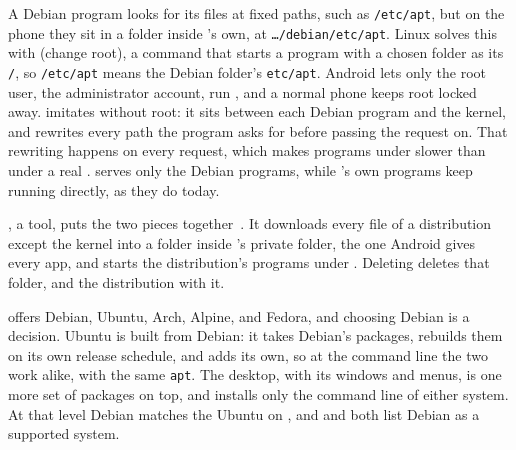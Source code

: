 \documentclass[11pt,a4paper]{article}
\begin{document}
 A Debian program looks for its files at fixed paths, such as \texttt{/etc/apt}, but on the phone they sit in a folder inside 's own, at \texttt{\ldots/debian/etc/apt}. Linux solves this with  (change root), a command that starts a program with a chosen folder as its \texttt{/}, so \texttt{/etc/apt} means the Debian folder's \texttt{etc/apt}. Android lets only the root user, the administrator account, run , and a normal phone keeps root locked away.  imitates  without root: it sits between each Debian program and the kernel, and rewrites every path the program asks for before passing the request on. That rewriting happens on every request, which makes programs under  slower than under a real .  serves only the Debian programs, while 's own programs keep running directly, as they do today.

 , a  tool, puts the two pieces together~\cite{proot}. It downloads every file of a distribution except the kernel into a folder inside 's private folder, the one Android gives every app, and starts the distribution's programs under . Deleting  deletes that folder, and the distribution with it.

  offers Debian, Ubuntu, Arch, Alpine, and Fedora, and choosing Debian is a decision. Ubuntu is built from Debian: it takes Debian's packages, rebuilds them on its own release schedule, and adds its own, so at the command line the two work alike, with the same \texttt{apt}. The desktop, with its windows and menus, is one more set of packages on top, and  installs only the command line of either system. At that level Debian matches the Ubuntu on , and  and  both list Debian as a supported system.
\end{document}
